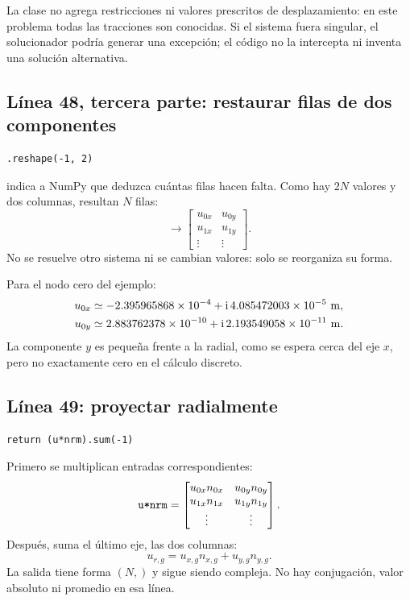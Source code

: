 \documentclass[11pt,a4paper]{article}
\numberwithin{equation}{section}
\newcommand{\ii}{\mathrm{i}}
\DeclareRobustCommand{\code}[1]{\texttt{\detokenize{#1}}}
\begin{document}
La clase no agrega restricciones ni valores prescritos de desplazamiento:
en este problema todas las tracciones son conocidas.
Si el sistema fuera singular, el solucionador podr\'ia generar una
excepci\'on; el c\'odigo no la intercepta ni inventa una soluci\'on alternativa.

\subsection{L\'inea 48, tercera parte: restaurar filas de dos componentes}
\begin{lstlisting}
.reshape(-1, 2)
\end{lstlisting}
\code{-1} indica a NumPy que deduzca cu\'antas filas hacen falta.
Como hay $2N$ valores y dos columnas, resultan $N$ filas:
\begin{equation}
 [u_{0x},u_{0y},u_{1x},u_{1y},\ldots]
 \longrightarrow
 \begin{bmatrix}
 u_{0x}&u_{0y}\\
 u_{1x}&u_{1y}\\
 \vdots&\vdots
 \end{bmatrix}.
\end{equation}
No se resuelve otro sistema ni se cambian valores: solo se reorganiza
su forma.

Para el nodo cero del ejemplo:
\begin{align}
 u_{0x}&\simeq-2.395965868\times10^{-4}
                 +\ii\,4.085472003\times10^{-5}\ {\rm m},\\
 u_{0y}&\simeq2.883762378\times10^{-10}
                 +\ii\,2.193549058\times10^{-11}\ {\rm m}.
\end{align}
La componente $y$ es peque\~na frente a la radial, como se espera
cerca del eje $x$, pero no exactamente cero en el c\'alculo discreto.

\subsection{L\'inea 49: proyectar radialmente}
\begin{lstlisting}
return (u*nrm).sum(-1)
\end{lstlisting}
Primero se multiplican entradas correspondientes:
\begin{equation}
 \code{u*nrm}=
 \begin{bmatrix}
 u_{0x}n_{0x}&u_{0y}n_{0y}\\
 u_{1x}n_{1x}&u_{1y}n_{1y}\\
 \vdots&\vdots
 \end{bmatrix}.
\end{equation}
Despu\'es, \code{sum(-1)} suma el \'ultimo eje, las dos columnas:
\begin{equation}
 \boxed{u_{r,g}=u_{x,g}n_{x,g}+u_{y,g}n_{y,g}.}
 \label{eq:proyeccion}
\end{equation}
La salida tiene forma $(N,)$ y sigue siendo compleja.
No hay conjugaci\'on, valor absoluto ni promedio en esa l\'inea.
\end{document}
